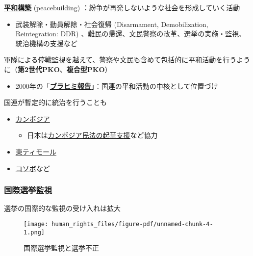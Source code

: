 \documentclass[
  xelatex,
  ja=standard]{bxjsarticle}
\providecommand{\tightlist}{%
  \setlength{\itemsep}{0pt}\setlength{\parskip}{0pt}}\usepackage{longtable,booktabs,array}
\begin{document}
\href{https://www.mofa.go.jp/mofaj/gaiko/peace_b/index.html}{\textbf{平和構築}}
(peacebuilding) ：紛争が再発しないような社会を形成していく活動

\begin{itemize}
\tightlist
\item
  武装解除・動員解除・社会復帰 (Disarmament, Demobilization,
  Reintegration: DDR)
  、難民の帰還、文民警察の改革、選挙の実施・監視、統治機構の支援など
\end{itemize}

軍隊による停戦監視を越えて、警察や文民も含めて包括的に平和活動を行うように（\textbf{第2世代PKO}、\textbf{複合型PKO}）

\begin{itemize}
\tightlist
\item
  2000年の「\href{https://www.unic.or.jp/files/a_55_305.pdf}{\textbf{ブラヒミ報告}}」：国連の平和活動の中核として位置づけ
\end{itemize}

国連が暫定的に統治を行うことも

\begin{itemize}
\tightlist
\item
  \href{https://www.unic.or.jp/activities/peace_security/action_for_peace/asia_pacific/cambodia/}{カンボジア}

  \begin{itemize}
  \tightlist
  \item
    日本は\href{http://www.moj.go.jp/housouken/houso_houkoku_cambo.html}{カンボジア民法の起草支援}など協力
  \end{itemize}
\item
  \href{https://www.unic.or.jp/activities/peace_security/independence/declaration/east_timor/}{東ティモール}
\item
  \href{https://www.unic.or.jp/activities/peace_security/action_for_peace/europe/kosovo/}{コソボ}など
\end{itemize}

\hypertarget{ux56fdux969bux9078ux6319ux76e3ux8996}{%
\subsubsection{国際選挙監視}\label{ux56fdux969bux9078ux6319ux76e3ux8996}}

選挙の国際的な監視の受け入れは拡大

\begin{figure}[htpb]

{\centering \texttt{[image: human\_rights\_files/figure-pdf/unnamed-chunk-4-1.png]}

}

\caption{国際選挙監視と選挙不正}

\end{figure}
\end{document}
